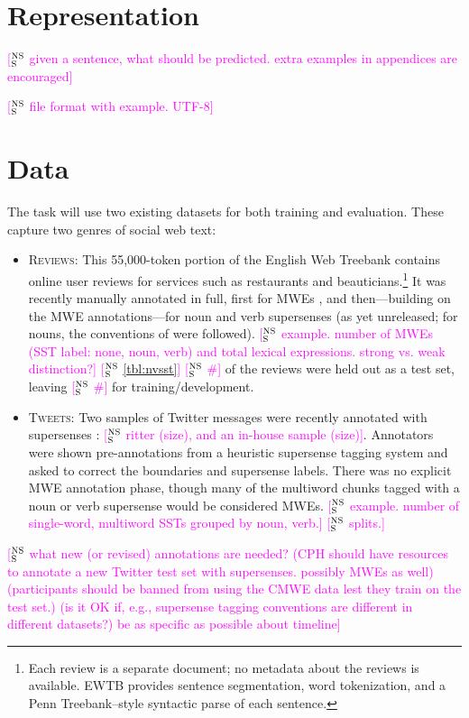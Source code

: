 \documentclass[11pt]{article}
\newcommand{\ensuretext}[1]{#1}
\newcommand{\nssmarker}{\ensuretext{\textcolor{magenta}{\ensuremath{^{\textsc{NS}}_{\textsc{S}}}}}}
\newcommand{\arkcomment}[3]{\ensuretext{\textcolor{#3}{[#1 #2]}}}
\newcommand{\nss}[1]{\arkcomment{\nssmarker}{#1}{magenta}}
\begin{document}
\section{Representation}

\nss{given a sentence, what should be predicted. extra examples in appendices are encouraged}

\nss{file format with example. UTF-8}

\section{Data}

The task will use two existing datasets for both training and evaluation. 
These capture two genres of social web text:
\begin{itemize}
\item \textsc{Reviews}: This 55,000-token portion of the English Web Treebank \citep[EWTB;][]{ewtb} 
contains online user reviews for services such as restaurants and beauticians.\footnote{Each review is a separate document; 
no metadata about the reviews is available. EWTB provides sentence segmentation, word tokenization, and a Penn Treebank--style 
syntactic parse of each sentence.}
It was recently manually annotated in full, first for MWEs \citep[released as the CMWE Corpus\footnote{\url{http://www.ark.cs.cmu.edu/LexSem/}}]{schneider-14-corpus}, 
and then---building on the MWE annotations---for noun and verb supersenses (as yet unreleased; for nouns, the conventions of \citealp{schneider-12} were followed). 
\nss{example. number of MWEs (SST label: none, noun, verb) and total lexical expressions. strong vs. weak distinction?}
\nss{\cref{tbl:nvsst}}
\nss{\#} of the reviews were held out as a test set, leaving \nss{\#} for training\slash development.
\item \textsc{Tweets}: Two samples of Twitter messages were recently annotated with supersenses \citep{johannsen-14}: 
\nss{ritter (size), and an in-house sample (size)}. Annotators were shown pre-annotations from a heuristic supersense tagging system 
and asked to correct the boundaries and supersense labels. There was no explicit MWE annotation phase, 
though many of the multiword chunks tagged with a noun or verb supersense would be considered MWEs. 
\nss{example. number of single-word, multiword SSTs grouped by noun, verb.}
\nss{splits.}
\end{itemize}

\nss{what new (or revised) annotations are needed? 
(CPH should have resources to annotate a new Twitter test set with supersenses. possibly MWEs as well)
(participants should be banned from using the CMWE data lest they train on the test set.)
(is it OK if, e.g., supersense tagging conventions are different in different datasets?)
be as specific as possible about timeline}
\end{document}
